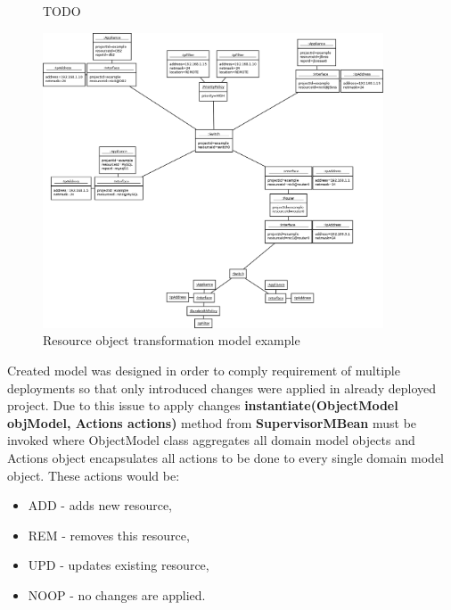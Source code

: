 \documentclass[11pt]{book}
\begin{document}
          \begin{figure}[H]

            \centering

            \caption{TODO}
            \label{fig:impl:transformation}
          
          \end{figure}

        
        \begin{figure}[H]
        \begin{center}
        \includegraphics[width=0.9\textwidth]{img/impl/resource-object-model-example.png}
        \end{center}
        \caption{Resource object transformation model example}
        \end{figure}

        Created model was designed in order to comply requirement of multiple deployments so that only introduced
        changes were applied in already deployed project. Due to this issue to apply changes
        \textbf{instantiate(ObjectModel objModel, Actions actions)} method from \textbf{SupervisorMBean} must be invoked
        where ObjectModel class aggregates all domain model objects and Actions object encapsulates all actions to be
        done to every single domain model object. These actions would be:

        \begin{itemize}
        \item {ADD - adds new resource,}
        \item {REM - removes this resource,}
        \item {UPD - updates existing resource,}
        \item {NOOP - no changes are applied.}
        \end{itemize}
\end{document}
